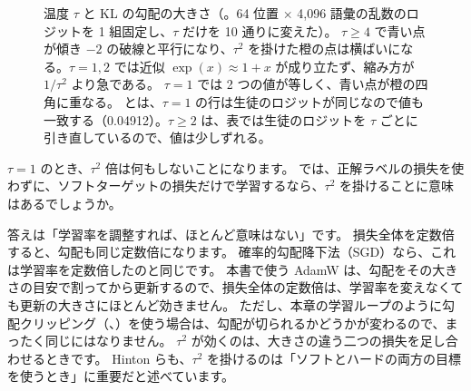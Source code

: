 \begin{figure}[tbp]
\centering
{}
\caption{温度 $\tau$ と KL の勾配の大きさ（。64 位置 × 4,096 語彙の乱数のロジットを 1 組固定し、$\tau$ だけを 10 通りに変えた）。
$\tau\ge4$ で青い点が傾き $-2$ の破線と平行になり、$\tau^2$ を掛けた橙の点は横ばいになる。$\tau=1,2$ では近似 $\exp(x)\approx1+x$ が成り立たず、縮み方が $1/\tau^2$ より急である。
$\tau=1$ では 2 つの値が等しく、青い点が橙の四角に重なる。
とは、$\tau=1$ の行は生徒のロジットが同じなので値も一致する（0.04912）。$\tau\ge2$ は、表では生徒のロジットを $\tau$ ごとに引き直しているので、値は少しずれる。}
\label{fig:distill-tau-sweep}
\end{figure}

\begin{quiz}
$\tau=1$ のとき、$\tau^2$ 倍は何もしないことになります。
では、正解ラベルの損失を使わずに、ソフトターゲットの損失だけで学習するなら、$\tau^2$ を掛けることに意味はあるでしょうか。
\end{quiz}

答えは「学習率を調整すれば、ほとんど意味はない」です。
損失全体を定数倍すると、勾配も同じ定数倍になります。
確率的勾配降下法（SGD）なら、これは学習率を定数倍したのと同じです。
本書で使う AdamW は、勾配をその大きさの目安で割ってから更新するので、損失全体の定数倍は、学習率を変えなくても更新の大きさにほとんど効きません。
ただし、本章の学習ループのように勾配クリッピング（、）を使う場合は、勾配が切られるかどうかが変わるので、まったく同じにはなりません。
$\tau^2$ が効くのは、大きさの違う二つの損失を足し合わせるときです。
Hinton らも、$\tau^2$ を掛けるのは「ソフトとハードの両方の目標を使うとき」に重要だと述べています\cite{hinton2015distilling}。


